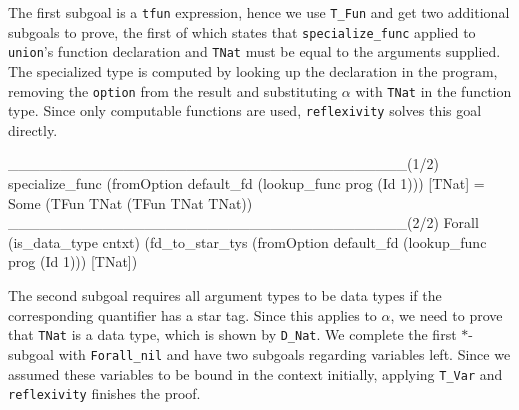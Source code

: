 \documentclass[fleqn]{scrreprt}
\newcommand{\coqinline}[1]{\texttt{#1}}
\begin{document}
The first subgoal is a \coqinline{tfun} expression, hence we use \coqinline{T_Fun} and get two additional subgoals to prove, the first of which states that \coqinline{specialize_func} applied to \texttt{union}'s function declaration and \texttt{TNat} must be equal to the arguments supplied. The specialized type is computed by looking up the declaration in the program, removing the \coqinline{option} from the result and substituting $\alpha$ with \coqinline{TNat} in the function type. Since only computable functions are used, \coqinline{reflexivity} solves this goal directly.
\begin{coqcode}
______________________________________(1/2)
specialize_func (fromOption default_fd (lookup_func prog (Id 1))) [TNat] =
Some (TFun TNat (TFun TNat TNat))
______________________________________(2/2)
Forall (is_data_type cntxt)
(fd_to_star_tys (fromOption default_fd (lookup_func prog (Id 1))) [TNat])
\end{coqcode}
The second subgoal requires all argument types to be data types if the corresponding quantifier has a star tag. Since this applies to $\alpha$, we need to prove that \coqinline{TNat} is a data type, which is shown by \coqinline{D_Nat}. We complete the first $*$-subgoal with \coqinline{Forall_nil} and have two subgoals regarding variables left. Since we assumed these variables to be bound in the context initially, applying \coqinline{T_Var} and \coqinline{reflexivity} finishes the proof.
\end{document}
